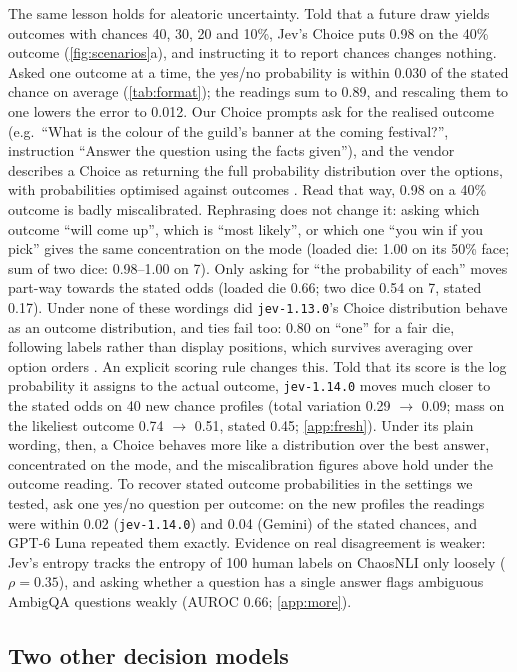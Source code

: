 \documentclass[10pt,twocolumn]{article}
\begin{document}
The same lesson holds for aleatoric uncertainty. Told that a future draw yields
outcomes with chances 40, 30, 20 and 10\%, Jev's Choice puts 0.98 on the 40\%
outcome (\cref{fig:scenarios}a), and instructing it to report chances changes
nothing. Asked one outcome at a time, the yes/no probability is within 0.030 of
the stated chance on average (\cref{tab:format}); the readings sum to 0.89, and
rescaling them to one lowers the error to 0.012. Our Choice prompts ask for
the realised outcome (e.g.\ ``What is the colour of the guild's banner at the
coming festival?'', instruction ``Answer the question using the facts
given''), and the vendor describes a Choice as returning the full
probability distribution over the options, with probabilities optimised
against outcomes \citep{typesafe2026choice,typesafe2026systemone}. Read that
way, 0.98 on a 40\% outcome is badly miscalibrated. Rephrasing does not change
it: asking which outcome ``will come up'', which is ``most likely'', or which
one ``you win if you pick'' gives the same concentration on the mode (loaded
die: 1.00 on its 50\% face; sum of two dice: 0.98--1.00 on 7). Only asking for
``the probability of each'' moves part-way towards the stated odds (loaded die
0.66; two dice 0.54 on 7, stated 0.17). Under none of these wordings did
\texttt{jev-1.13.0}'s Choice distribution behave as an outcome distribution,
and ties fail too: 0.80 on ``one'' for a fair die,
following labels rather than display positions, which survives averaging
over option orders \citep{zheng2024large}. An explicit scoring rule changes
this. Told that its score is the log probability it assigns to the actual
outcome, \texttt{jev-1.14.0} moves much closer to the stated odds on 40 new
chance profiles (total variation 0.29 $\to$ 0.09; mass on the likeliest
outcome 0.74 $\to$ 0.51, stated 0.45; \cref{app:fresh}). Under its plain
wording, then, a Choice behaves more like a distribution over the best
answer, concentrated on the mode, and the miscalibration figures above hold
under the outcome reading. To recover stated outcome probabilities in the
settings we tested, ask one yes/no question per outcome: on the new profiles the readings were
within 0.02 (\texttt{jev-1.14.0}) and 0.04 (Gemini) of the stated chances,
and GPT-6 Luna repeated them exactly. Evidence on real disagreement is weaker:
Jev's entropy tracks the entropy of 100 human labels on ChaosNLI only loosely
($\rho=0.35$), and asking whether a question has a single answer flags
ambiguous AmbigQA questions weakly (AUROC 0.66; \cref{app:more}).

\subsection{Two other decision models}
\label{sec:cross}
\end{document}
